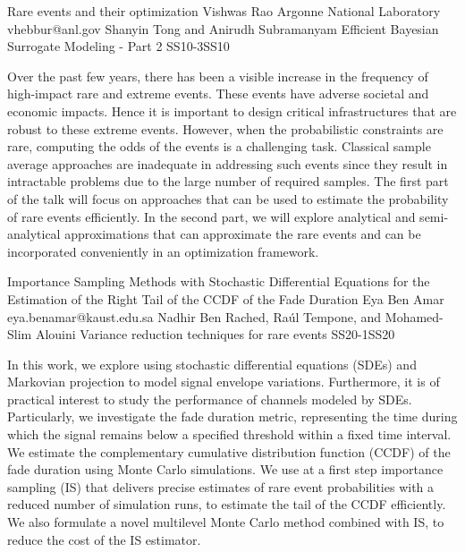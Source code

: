 \begin{talk}
{Rare events and their optimization}
{Vishwas Rao}
{Argonne National Laboratory}
{vhebbur@anl.gov}
{Shanyin Tong and Anirudh Subramanyam }
{Efficient Bayesian Surrogate Modeling - Part 2}
{}{SS10-3}{SS10}



Over the past few years, there has been a visible increase in the frequency of high-impact rare and extreme events. These events have adverse societal and economic impacts. Hence it is important to design critical infrastructures that are robust to these extreme events. However, when the probabilistic constraints are rare, computing the odds of the events is a challenging task. Classical sample average approaches are inadequate in addressing such events since they result in intractable problems due to the large number of required samples. The first part of the talk will focus on approaches that can be used to estimate the probability of rare events efficiently. In the second part, we will explore analytical and semi-analytical approximations that can approximate the rare events and can be incorporated conveniently in an optimization framework.

\end{talk}

\begin{talk}
  {Importance Sampling Methods with Stochastic Differential Equations for the Estimation of the Right Tail of the CCDF of the Fade Duration}%
  {Eya Ben Amar}%
  {}%
  {eya.benamar@kaust.edu.sa}%
  {Nadhir Ben Rached, Ra\'ul Tempone, and Mohamed-Slim Alouini}%
{Variance reduction techniques for rare events}
{}{SS20-1}{SS20}

			
In this work, we explore using stochastic differential equations (SDEs) and Markovian projection to model signal envelope variations. Furthermore, it is of practical interest to study the performance of channels modeled by SDEs. Particularly, we investigate the fade duration metric, representing the time during which the signal remains below a specified threshold within a fixed time interval. We estimate the complementary cumulative distribution function (CCDF) of the fade duration using Monte Carlo simulations. We use at a first step importance sampling (IS) that delivers precise estimates of rare event probabilities with a reduced number of simulation runs, to estimate the tail of the CCDF efficiently. We also formulate a novel multilevel Monte Carlo method combined with IS, to reduce the cost of the IS estimator. 

\medskip

\end{talk}

